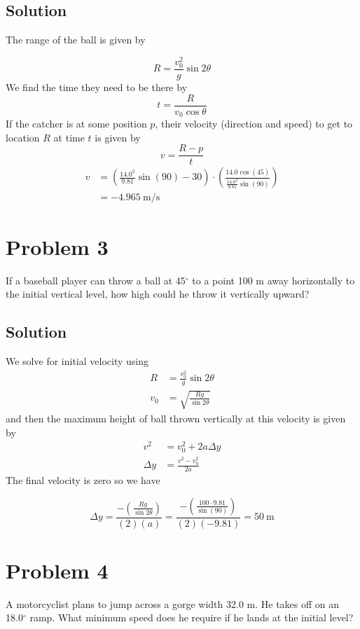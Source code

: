\documentclass{article}
\begin{document}
\subsection*{Solution}
The range of the ball is given by

\begin{equation}
	R = \frac{v_0^2}{g}\sin2\theta
\end{equation}
We find the time they need to be there by
\begin{equation}
	t = \frac{R}{v_0 \cos\theta}
\end{equation}
If the catcher is at some position $p$, their velocity (direction and speed) to get to location $R$ at time $t$ is given by
\begin{equation}
	v = \frac{R-p}{t}
\end{equation}
\begin{align*}
	v &= \left(\frac{14.0^2}{9.81}\sin(90) - 30\right) \cdot \left(\frac{14.0 \cos(45)}{\frac{14.0^2}{9.81}\sin(90)}\right) \\
	  &= \boxed{-4.965\ \text{m/s}}
\end{align*}

\section*{Problem 3}
If a baseball player can throw a ball at 45$^\circ$ to a point 100 m away horizontally to the initial
vertical level, how high could he throw it vertically upward?

\subsection*{Solution}
We solve for initial velocity using
\begin{align*}
	R &= \frac{v_0^2}{g}\sin 2\theta \\
	v_0 &= \sqrt{\frac{Rg}{\sin 2\theta}}
\end{align*}
and then the maximum height of ball thrown vertically at this velocity is given by
\begin{align*}
	v^2 &= v_0^2  + 2a\Delta y \\
	\Delta y &= \frac{v^2-v_0^2}{2a}
\end{align*}
The final velocity is zero so we have

\[
	\Delta y = \frac{-\left( \frac{Rg}{\sin 2\theta} \right)}{(2)(a)} = \frac{-\left( \frac{100 \cdot 9.81}{\sin(90)} \right)}{(2)(-9.81)} = \boxed{50\ \text{m}}
\]

\section*{Problem 4}
A motorcyclist plans to jump across a gorge width 32.0 m. He takes off on an 18.0$^\circ$ ramp.
What minimum speed does he require if he lands at the initial level?
\end{document}
